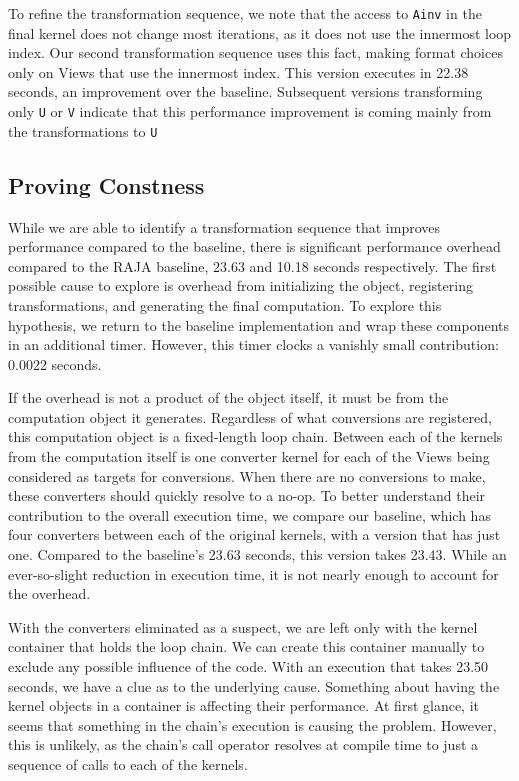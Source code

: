 To refine the transformation sequence, we note that the access to \verb.Ainv. in the final kernel does not change most iterations, as it does not use the innermost loop index. 
Our second transformation sequence uses this fact, making format choices only on Views that use the innermost index. 
This version executes in 22.38 seconds, an improvement over the \FormatDecisions{} baseline. 
Subsequent versions transforming only \verb.U. or \verb.V. indicate that this performance improvement is coming mainly from the transformations to \verb.U.

\subsection{Proving Constness}

While we are able to identify a transformation sequence that improves performance compared to the \FormatDecisions{} baseline, there is significant performance overhead compared to the RAJA baseline, 23.63 and 10.18 seconds respectively.
The first possible cause to explore is overhead from initializing the \FormatDecisions{} object, registering transformations, and generating the final computation. 
To explore this hypothesis, we return to the baseline implementation and wrap these components in an additional timer. 
However, this timer clocks a vanishly small contribution: 0.0022 seconds.

If the overhead is not a product of the \FormatDecisions{} object itself, it must be from the computation object it generates.
Regardless of what conversions are registered, this computation object is a fixed-length loop chain.
Between each of the kernels from the computation itself is one converter kernel for each of the Views being considered as targets for conversions.
When there are no conversions to make, these converters should quickly resolve to a no-op.
To better understand their contribution to the overall execution time, we compare our baseline, which has four converters between each of the original kernels, with a version that has just one.
Compared to the baseline's 23.63 seconds, this version takes 23.43.
While an ever-so-slight reduction in execution time, it is not nearly enough to account for the overhead.

With the converters eliminated as a suspect, we are left only with the kernel container that holds the loop chain.
We can create this container manually to exclude any possible influence of the \FormatDecisions{} code.
With an execution that takes 23.50 seconds, we have a clue as to the underlying cause.
Something about having the kernel objects in a container is affecting their performance.
At first glance, it seems that something in the chain's execution is causing the problem.
However, this is unlikely, as the chain's call operator resolves at compile time to just a sequence of calls to each of the kernels.


